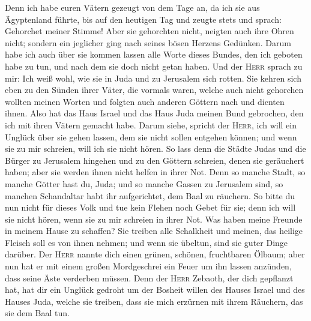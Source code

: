  Denn ich habe euren Vätern gezeugt von dem Tage an, da
ich sie aus Ägyptenland führte, bis auf den heutigen Tag und zeugte
stets und sprach: Gehorchet meiner Stimme!  Aber sie
gehorchten nicht, neigten auch ihre Ohren nicht; sondern ein jeglicher
ging nach seines bösen Herzens Gedünken. Darum habe ich auch über sie
kommen lassen alle Worte dieses Bundes, den ich geboten habe zu tun, und
nach dem sie doch nicht getan haben.  Und der
\textsc{Herr} sprach zu mir: Ich weiß wohl, wie sie in Juda und zu
Jerusalem sich rotten.  Sie kehren sich eben zu den
Sünden ihrer Väter, die vormals waren, welche auch nicht gehorchen
wollten meinen Worten und folgten auch anderen Göttern nach und dienten
ihnen. Also hat das Haus Israel und das Haus Juda meinen Bund gebrochen,
den ich mit ihren Vätern gemacht habe.  Darum siehe,
spricht der \textsc{Herr}, ich will ein Unglück über sie gehen lassen,
dem sie nicht sollen entgehen können; und wenn sie zu mir schreien, will
ich sie nicht hören.  So lass denn die Städte Judas und
die Bürger zu Jerusalem hingehen und zu den Göttern schreien, denen sie
geräuchert haben; aber sie werden ihnen nicht helfen in ihrer Not.
 Denn so manche Stadt, so manche Götter hast du, Juda;
und so manche Gassen zu Jerusalem sind, so manchen Schandaltar habt ihr
aufgerichtet, dem Baal zu räuchern.  So bitte du nun
nicht für dieses Volk und tue kein Flehen noch Gebet für sie; denn ich
will sie nicht hören, wenn sie zu mir schreien in ihrer Not.
 Was haben meine Freunde in meinem Hause zu schaffen? Sie
treiben alle Schalkheit und meinen, das heilige Fleisch soll es von
ihnen nehmen; und wenn sie übeltun, sind sie guter Dinge darüber.
 Der \textsc{Herr} nannte dich einen grünen, schönen,
fruchtbaren Ölbaum; aber nun hat er mit einem großen Mordgeschrei ein
Feuer um ihn lassen anzünden, dass seine Äste verderben müssen.
 Denn der \textsc{Herr} Zebaoth, der dich gepflanzt hat,
hat dir ein Unglück gedroht um der Bosheit willen des Hauses Israel und
des Hauses Juda, welche sie treiben, dass sie mich erzürnen mit ihrem
Räuchern, das sie dem Baal tun.

